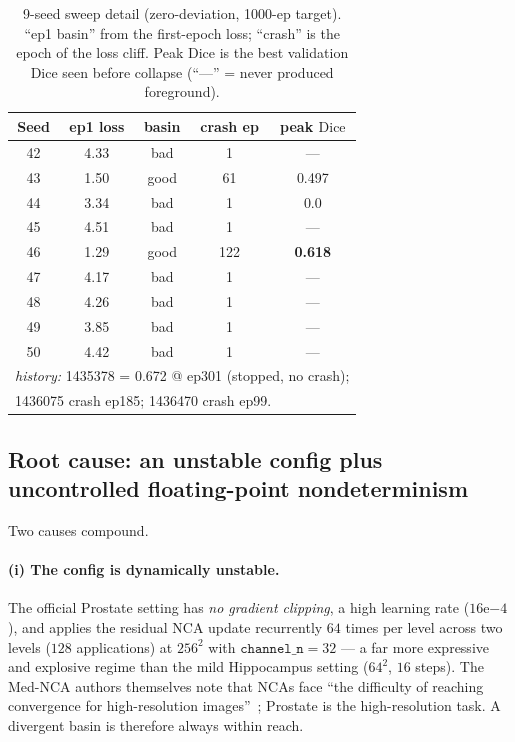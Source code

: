 \documentclass[10pt,twocolumn]{article}
\newcommand{\dice}{\mathrm{Dice}}
\begin{document}
\begin{table}[t]
\centering\small
\caption{9-seed sweep detail (zero-deviation, 1000-ep target). ``ep1
basin'' from the first-epoch loss; ``crash'' is the epoch of the loss
cliff. Peak Dice is the best validation Dice seen before collapse
(``---'' = never produced foreground).}
\label{tab:seed}
\begin{tabular}{ccccc}
\toprule
Seed & ep1 loss & basin & crash ep & peak $\dice$\\
\midrule
42 & 4.33 & bad  & 1   & ---\\
43 & 1.50 & \textcolor{passgreen}{good} & 61  & 0.497\\
44 & 3.34 & bad  & 1   & 0.0\\
45 & 4.51 & bad  & 1   & ---\\
46 & 1.29 & \textcolor{passgreen}{good} & 122 & \textbf{0.618}\\
47 & 4.17 & bad  & 1   & ---\\
48 & 4.26 & bad  & 1   & ---\\
49 & 3.85 & bad  & 1   & ---\\
50 & 4.42 & bad  & 1   & ---\\
\midrule
\multicolumn{5}{l}{\emph{history:} 1435378 = 0.672 @ ep301 (stopped, no crash);}\\
\multicolumn{5}{l}{1436075 crash ep185; 1436470 crash ep99.}\\
\bottomrule
\end{tabular}
\end{table}

\subsection{Root cause: an unstable config plus uncontrolled
floating-point nondeterminism}
\label{sec:r2root}

Two causes compound.

\paragraph{(i) The config is dynamically unstable.} The official Prostate
setting has \emph{no gradient clipping}, a high learning rate
($16\mathrm{e}{-4}$), and applies the residual NCA update recurrently
$64$ times per level across two levels ($128$ applications) at $256^2$ with
$\texttt{channel\_n}=32$ --- a far more expressive and explosive regime than
the mild Hippocampus setting ($64^2$, $16$ steps). The Med-NCA authors
themselves note that NCAs face ``the difficulty of reaching convergence for
high-resolution images''~\cite{kalkhof2023mednca}; Prostate is the
high-resolution task. A divergent basin is therefore always within reach.
\end{document}
